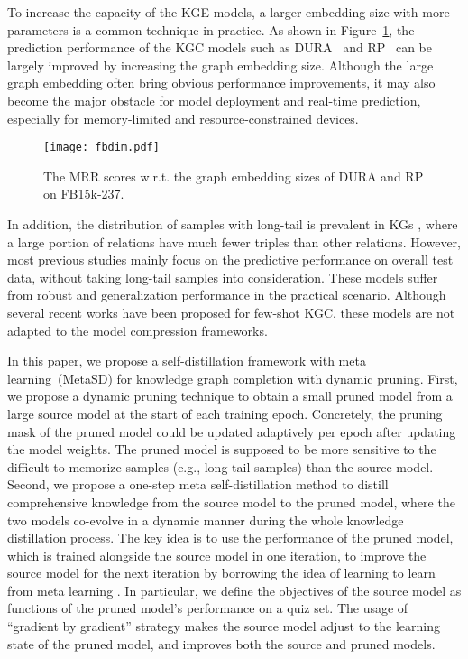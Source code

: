 \documentclass[11pt]{article}
\begin{document}
To increase the capacity of the KGE models, a larger embedding size with more parameters is a common technique in practice. As shown in Figure~\ref{fig:fbdim}, the prediction performance of the KGC models such as DURA~\citep{zhang2020duality} and RP~\citep{chen2021relation} can be largely improved by increasing the graph embedding size. Although the large graph embedding often bring obvious performance improvements, it may also become the major obstacle for model deployment and real-time prediction, especially for memory-limited and resource-constrained devices.

\begin{figure}[t]
\centering \texttt{[image: fbdim.pdf]}
\caption{The MRR scores w.r.t. the graph embedding sizes of DURA and RP on FB15k-237.}
\label{fig:fbdim}
\end{figure}

In addition, the distribution of samples with long-tail is prevalent in KGs \cite{zhang2019long}, where a large portion of relations have much fewer triples than other relations. However, most previous studies mainly focus on the predictive performance on overall test data, without taking long-tail samples into consideration. These models suffer from robust and generalization performance in the practical scenario. 
Although several recent works \cite{xiong2018one,sheng2020adaptive} have been proposed for few-shot KGC, these models are not adapted to the model compression frameworks.



In this paper, we propose a self-distillation framework with meta learning~(MetaSD) for knowledge graph completion with dynamic pruning. First, we propose a dynamic pruning technique to obtain a small pruned model from a large source model at the start of each training epoch. Concretely, the pruning mask of the pruned model could be updated adaptively per epoch after updating the model weights. The pruned model is supposed to be more sensitive to the difficult-to-memorize samples (e.g., long-tail samples) than the source model. 
Second, we propose a one-step meta self-distillation method to distill comprehensive knowledge from the source model to the pruned model, where the two models co-evolve in a dynamic manner during the whole knowledge distillation process.
The key idea is to use the performance of the pruned model, which is trained alongside the source model in one iteration, to improve the source model for the next iteration by borrowing the idea of learning to learn from meta learning \cite{finn2017model}. 
In particular, we define the objectives of the source model as functions of the pruned model’s performance on a quiz set. The usage of ``gradient by gradient'' strategy makes the source model adjust to the learning state of the pruned model, and improves both the source and pruned models.  
\end{document}
